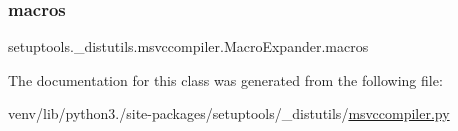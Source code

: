 \subsubsection{\texorpdfstring{macros}{macros}}
{\footnotesize\ttfamily setuptools.\+\_\+distutils.\+msvccompiler.\+Macro\+Expander.\+macros}



The documentation for this class was generated from the following file\+:\begin{DoxyCompactItemize}
\item 
venv/lib/python3./site-\/packages/setuptools/\+\_\+distutils/\hyperlink{setuptools_2__distutils_2msvccompiler_8py}{msvccompiler.\+py}\end{DoxyCompactItemize}

